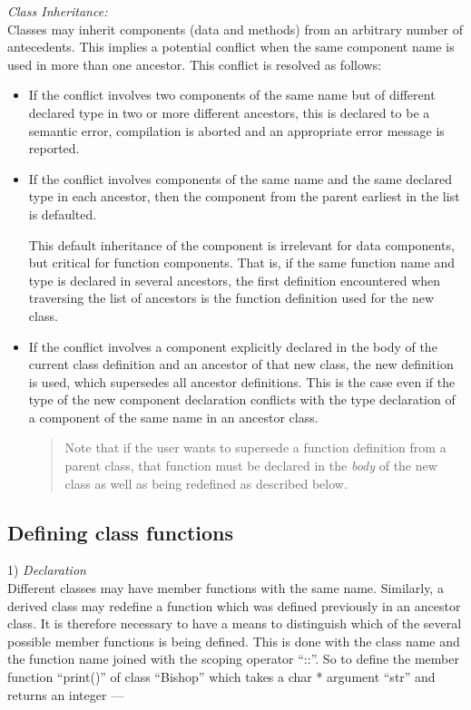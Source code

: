 {\flushleft \large \em Class Inheritance:}\\
Classes may inherit components (data and methods) from an arbitrary number
of antecedents.  This implies a potential conflict when the same component
name is used in more than one ancestor.  This conflict is resolved as
follows:
\begin{itemize}
\item If the conflict involves two components of the same name but of different
declared type in two or more different ancestors, this is declared
to be a semantic error,
compilation is aborted and an appropriate error message is reported.
\item If the conflict involves components of the same name and the same
declared type in each ancestor, then the component from the parent
earliest in the list is defaulted.

This default inheritance of the component is irrelevant for
data components, but critical for function components.  That is, if the
same function name and type is declared in several ancestors, the first
definition encountered when traversing the list of ancestors is the
function definition used for the new class.
\item
If the conflict involves a component explicitly declared in the
body of the current class definition and an ancestor of that new class, the
new definition is used, which supersedes all ancestor definitions.
This is the case even if the type of the new component declaration
conflicts with the type declaration of a component of the same name in an
ancestor class.
\begin{quote}
Note that if the user wants to supersede a function
definition from a parent class, that function must be declared in the
{\em body}
of the new class as well as being redefined as described below.
\end{quote}
\end{itemize}

\subsection{Defining class functions}
1) {\large \em Declaration}\\
Different classes may have member functions with the same name.
Similarly, a derived class may redefine a function which was defined
previously in an ancestor class.  It is therefore necessary to have a means
to distinguish which of the several possible member functions is being defined.
This is done with the class name and the function name joined with the
scoping operator ``::''.  So to define the member function ``print()'' of class
``Bishop''  which takes a char * argument ``str'' and returns an integer ---

